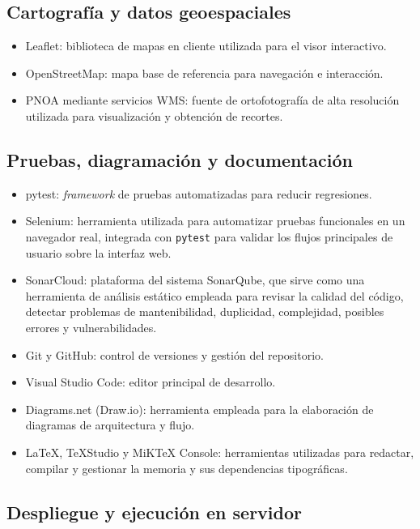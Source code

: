 \subsection{Cartografía y datos geoespaciales}

\begin{itemize}
	\item Leaflet: biblioteca de mapas en cliente utilizada para el visor interactivo.
	\item OpenStreetMap: mapa base de referencia para navegación e interacción.
	\item PNOA mediante servicios WMS: fuente de ortofotografía de alta resolución utilizada para visualización y obtención de recortes.
\end{itemize}

\subsection{Pruebas, diagramación y documentación}

\begin{itemize}
	\item pytest: \textit{framework} de pruebas automatizadas para reducir regresiones.
	\item Selenium: herramienta utilizada para automatizar pruebas funcionales en un navegador real, integrada con \texttt{pytest} para validar los flujos principales de usuario sobre la interfaz web.
	\item SonarCloud: plataforma del sistema SonarQube, que sirve como una herramienta de análisis estático empleada para revisar la calidad del código, detectar problemas de mantenibilidad, duplicidad, complejidad, posibles errores y vulnerabilidades.
	\item Git y GitHub: control de versiones y gestión del repositorio.
	\item Visual Studio Code: editor principal de desarrollo.
	\item Diagrams.net (Draw.io): herramienta empleada para la elaboración de diagramas de arquitectura y flujo.
	\item \LaTeX{}, \TeX{}Studio y MiK\TeX{} Console: herramientas utilizadas para redactar, compilar y gestionar la memoria y sus dependencias tipográficas.
\end{itemize}

\subsection{Despliegue y ejecución en servidor}

